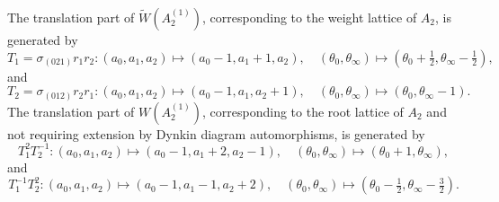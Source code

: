 \documentclass[a4paper,reqno]{amsart}
\numberwithin{equation}{section}
\newcommand{\pain}[1]{\operatorname{P}_{\mathrm{#1}}}
\numberwithin{equation}{section}
\begin{document}
\begin{table}[h]
    \caption{Symmetries of $\pain{IV}$ on variables $(f,g)$, parameters $\theta$, root variables $a$ and independent variable $t$.}
    \label{tab:PIV:symmetry:varsandparams}
\end{table}
\endgroup

The translation part of $\widetilde{W}(A_2^{(1)})$, corresponding to the weight lattice of $A_2$, is generated by 
    $$T_1=\sigma_{(021)}r_1r_2 : (a_0,a_1,a_2)\mapsto(a_0-1,a_1+1,a_2), \quad(\theta_0,\theta_{\infty})\mapsto(\theta_0+\tfrac{1}{2},\theta_{\infty}-\tfrac{1}{2}),$$
    and 
    $$T_2= \sigma_{(012)}r_2r_1 
    : (a_0,a_1,a_2)\mapsto(a_0-1,a_1,a_2+1),\quad(\theta_0,\theta_{\infty})\mapsto(\theta_0,\theta_{\infty}-1).$$
    The translation part of $W(A_2^{(1)})$, corresponding to the root lattice of $A_2$ and not requiring extension by Dynkin diagram automorphisms, is generated by 
    $$T_1^2T_2^{-1}: (a_0,a_1,a_2) \mapsto (a_0-1,a_1+2,a_2-1), \quad (\theta_0,\theta_{\infty})\mapsto(\theta_0+1,\theta_{\infty}),$$
    and 
    $$T_1^{-1}T_2^{2} : (a_0,a_1,a_2) \mapsto (a_0-1,a_1-1,a_2+2), \quad (\theta_0,\theta_{\infty})\mapsto(\theta_0-\tfrac{1}{2},\theta_{\infty}-\tfrac{3}{2}).$$
\end{document}
